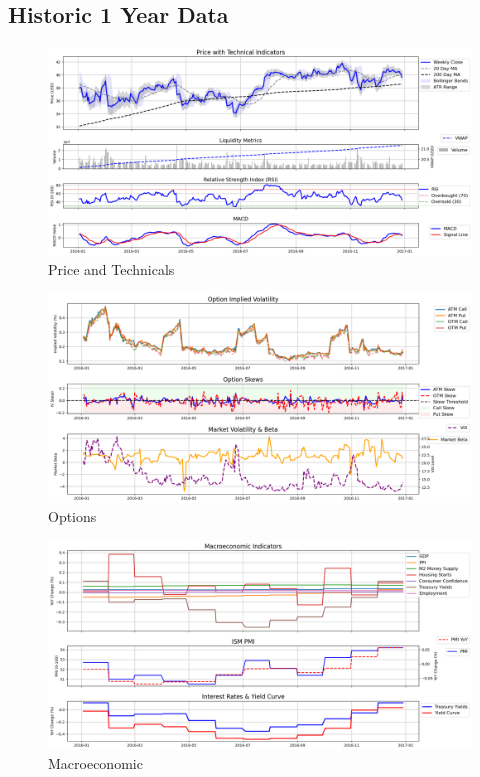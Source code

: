\documentclass[8pt]{scrartcl}
\begin{document}
\subsection*{Historic 1 Year Data}

\begin{figure}[H]
    \centering
    \includegraphics[width=1\linewidth]{judge_reviews/GOOGL_M_gpt-4o-mini//2017-01-01/judge_Price_with_Technical_Indicators.png}
    \caption{Price and Technicals}
\end{figure}

\begin{figure}[H]
    \centering
    \includegraphics[width=1\linewidth]{judge_reviews/GOOGL_M_gpt-4o-mini/2017-01-01/judge_Option_Implied_Volatility.png}
    \caption{Options}
\end{figure}

\begin{figure}[H]
    \centering
    \includegraphics[width=1\linewidth]{judge_reviews/GOOGL_M_gpt-4o-mini/2017-01-01/judge_Macroeconomic_Indicators.png}
    \caption{Macroeconomic}
\end{figure}
\end{document}
